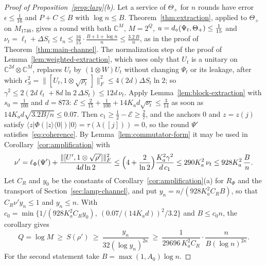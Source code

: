 \begin{proof}[Proof of Proposition~\ref{prop:lazy}(b)]
Let a service of $\Theta_+$ for $n$ rounds have error $\epsilon\le\frac1{16}$ and $P+C\le B$ with $\log n\le B$. Theorem~\ref{thm:extraction},
applied to $\Theta_+$ on $M_{1746}$, gives a round with bath $\mathbb C^M$, $M=2^Q$, $u=d_\diamond(\Psi_t,\Theta_+)\le\frac1{15}$ and
$\nu_t=\ell_t+\Delta S_t\le t_n\le\frac{16}{15}\cdot\frac{B+1+\log n}n\le\frac{3.2\,B}n$, as in the proof of Theorem~\ref{thm:main-channel}. The normalization
step of the proof of Lemma~\ref{lem:weighted-extraction}, which uses only that $U_t$ is a unitary on $\mathbb C^{2d}\otimes\mathbb C^M$, replaces $U_t$ by
$(1\otimes W)U_t$ without changing $\Psi_t$ or its leakage, after which $\epsilon_S^2=\|[U_t,1\otimes\sqrt{\rho_t}\,]\|_F^2\le4(2d)\Delta S_t\ln2$; so
$\gamma^2\le2(2d\ell_t+8d\ln2\,\Delta S_t)\le12d\,\nu_t$. Apply Lemma~\ref{lem:block-extraction} with $s_0=\frac1{100}$ and $d=873$:
$\mathcal E\le\frac2{15}+\frac1{100}+14K_ad\sqrt{\nu_t}\le\frac3{14}$ as soon as $14K_ad\sqrt{3.2B/n}\le0.07$. Then $c_1\ge\frac12-\mathcal E\ge\frac27$, and the anchors $0$
and $z=z(j)$ satisfy $\langle z|\Phi(|z\rangle\langle0|)|0\rangle=\tau(\lambda([j]))=0$, so the round $\Psi'$ satisfies~\eqref{eq:coherence}. By
Lemma~\ref{lem:commutator-form} it may be used in Corollary~\ref{cor:amplification} with
\[
\nu'=\ell_\Phi(\Psi')+\frac{\|[U',1\otimes\sqrt{\rho'}]\|_F^2}{4d\ln2}\le\Bigl(4+\frac2{\ln2}\Bigr)\frac{K_a^2\gamma^2}{d\,c_1}\le290K_a^2\,\nu_t\le928K_a^2\,\frac Bn .
\]
Let $C_R$ and $y_0$ be the constants of Corollary~\ref{cor:amplification}(a) for $R_\Phi$ and the transport of Section~\ref{sec:lamp-channel}, and put
$y_n=n/(928K_a^2C_RB)$, so that $C_R\nu'y_n\le1$ and $y_n\le n$. With
$c_0=\min\{1/(928K_a^2C_Ry_0),\ (0.07/(14K_ad))^2/3.2\}$ and $B\le c_0n$, the corollary gives
\[
Q=\log M\ \ge\ S(\rho')\ \ge\ \frac{y_n}{32(\log y_n)^{2\kappa}}\ \ge\ \frac1{29696\,K_a^2C_R}\cdot\frac n{B(\log n)^{2\kappa}} .
\]
For the second statement take $B=\max(1,A_0)\log n$.
\end{proof}

